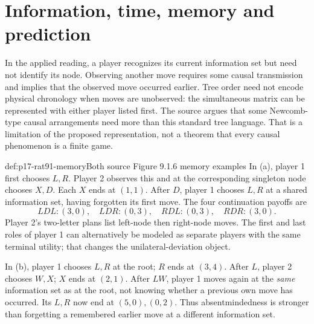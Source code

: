 \section{Information, time, memory and prediction}

In the applied reading, a player recognizes its current information
set but need not identify its node. Observing another move requires
some causal transmission and implies that the observed move occurred
earlier. Tree order need not encode physical chronology when moves
are unobserved: the simultaneous matrix can be represented with either
player listed first. The source argues that some Newcomb-type causal
arrangements need more than this standard tree language. That is a
limitation of the proposed representation, not a theorem that every
causal phenomenon is a finite game.

\begin{hbdefinition}{def:p17-rat91-memory}{Both source Figure 9.1.6 memory examples}
In (a), player 1 first chooses \(L,R\). Player 2 observes this and
at the corresponding singleton node chooses \(X,D\). Each \(X\)
ends at \((1,1)\). After \(D\), player 1 chooses \(L,R\)
at a shared information set, having forgotten its first move. The
four continuation payoffs are
\[
 LDL:(3,0),\quad LDR:(0,3),\quad RDL:(0,3),\quad RDR:(3,0).
\]
Player 2's two-letter plans list left-node then right-node moves.
The first and last roles of player 1 can alternatively be modeled
as separate players with the same terminal utility; that changes the
unilateral-deviation object.

In (b), player 1 chooses \(L,R\) at the root; \(R\) ends at
\((3,4)\). After \(L\), player 2 chooses \(W,X\);
\(X\) ends at \((2,1)\). After \(LW\), player 1 moves again
at the \emph{same} information set as at the root, not knowing
whether a previous own move has occurred. Its \(L,R\) now end
at \((5,0),(0,2)\). Thus absentmindedness is stronger than
forgetting a remembered earlier move at a different information set.
\end{hbdefinition}

